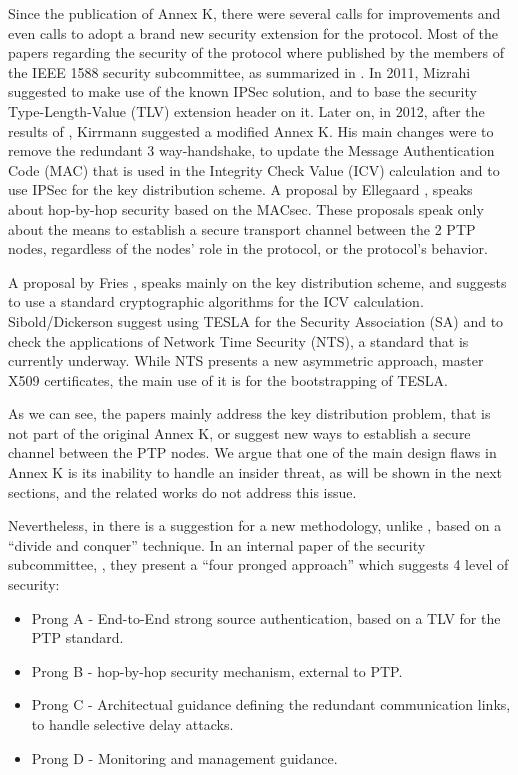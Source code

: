 \documentclass[11pt]{article}
\begin{document}
Since the publication of Annex K, there were several calls for improvements and even calls to adopt a brand new security extension for the protocol. Most of the papers regarding the security of the protocol where published by the members of the IEEE 1588 security subcommittee, as summarized in \cite{state_of_the_art}. In 2011, Mizrahi \cite{ISPCS_2011} suggested to make use of the known IPSec solution, and to base the security Type-Length-Value (TLV) extension header on it. Later on, in 2012, after the results of \cite{ISPCS_2012}, Kirrmann suggested a modified Annex K. His main changes were to remove the redundant 3 way-handshake, to update the Message Authentication Code (MAC) that is used in the Integrity Check Value (ICV) calculation and to use IPSec for the key distribution scheme. A proposal by Ellegaard \cite{Ellegaard}, speaks about hop-by-hop security based on the MACsec. These proposals speak only about the means to establish a secure transport channel between the 2 PTP nodes, regardless of the nodes' role in the protocol, or the protocol's behavior.

A proposal by Fries \cite{Fries}, speaks mainly on the key distribution scheme, and suggests to use a standard cryptographic algorithms for the ICV calculation. Sibold/Dickerson \cite{Sibold} \cite{Dickerson} suggest using TESLA \cite{TESLA} for the Security Association (SA) and to check the applications of Network Time Security (NTS), a standard that is currently underway. While NTS presents a new asymmetric approach, master X509 certificates, the main use of it is for the bootstrapping of TESLA.



As we can see, the papers mainly address the key distribution problem, that is not part of the original Annex K, or suggest new ways to establish a secure channel between the PTP nodes. We argue that one of the main design flaws in Annex K is its inability to handle an insider threat, as will be shown in the next sections, and the related works do not address this issue.



Nevertheless, in \cite{state_of_the_art} there is a suggestion for a new methodology, unlike \cite{rfc7384}, based on a ``divide and conquer'' technique. In an internal paper of the security subcommittee, \cite{Prongs}, they present a ``four pronged approach'' which suggests 4 level of security:

\begin{itemize}

  \item Prong A - End-to-End strong source authentication, based on a TLV for the PTP standard.

  \item Prong B - hop-by-hop security mechanism, external to PTP.

  \item Prong C - Architectual guidance defining the redundant communication links, to handle selective delay attacks.

  \item Prong D - Monitoring and management guidance.

\end{itemize}
\end{document}
